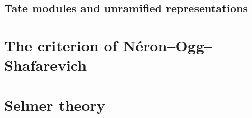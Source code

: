 




\subsection{Tate modules and unramified representations}




\section{The criterion of Néron--Ogg--Shafarevich}



% 
% 

\section{Selmer theory}










